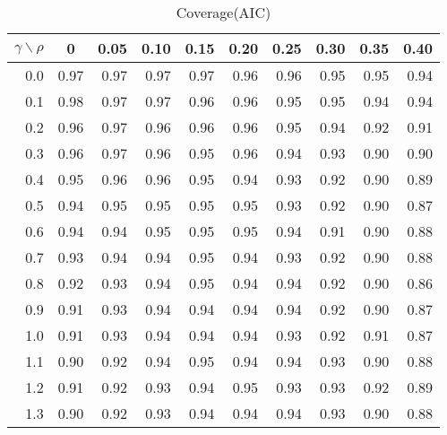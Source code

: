 \documentclass[12pt]{article}
\begin{document}
%
\begin{table}[!tbp]
\caption{Coverage(AIC)}
 \begin{center}
 \begin{tabular}{r|rrrrrrrrr}\hline\hline
\multicolumn{1}{c|}{$\gamma\backslash\rho$}&\multicolumn{1}{c}{0}&\multicolumn{1}{c}{0.05}&\multicolumn{1}{c}{0.10}&\multicolumn{1}{c}{0.15}&\multicolumn{1}{c}{0.20}&\multicolumn{1}{c}{0.25}&\multicolumn{1}{c}{0.30}&\multicolumn{1}{c}{0.35}&\multicolumn{1}{c}{0.40}\tabularnewline
\hline
0.0&0.97&0.97&0.97&0.97&0.96&0.96&0.95&0.95&0.94\tabularnewline
0.1&0.98&0.97&0.97&0.96&0.96&0.95&0.95&0.94&0.94\tabularnewline
0.2&0.96&0.97&0.96&0.96&0.96&0.95&0.94&0.92&0.91\tabularnewline
0.3&0.96&0.97&0.96&0.95&0.96&0.94&0.93&0.90&0.90\tabularnewline
0.4&0.95&0.96&0.96&0.95&0.94&0.93&0.92&0.90&0.89\tabularnewline
0.5&0.94&0.95&0.95&0.95&0.95&0.93&0.92&0.90&0.87\tabularnewline
0.6&0.94&0.94&0.95&0.95&0.95&0.94&0.91&0.90&0.88\tabularnewline
0.7&0.93&0.94&0.94&0.95&0.94&0.93&0.92&0.90&0.88\tabularnewline
0.8&0.92&0.93&0.94&0.95&0.94&0.94&0.92&0.90&0.86\tabularnewline
0.9&0.91&0.93&0.94&0.94&0.94&0.94&0.92&0.90&0.87\tabularnewline
1.0&0.91&0.93&0.94&0.94&0.94&0.93&0.92&0.91&0.87\tabularnewline
1.1&0.90&0.92&0.94&0.95&0.94&0.94&0.93&0.90&0.88\tabularnewline
1.2&0.91&0.92&0.93&0.94&0.95&0.93&0.93&0.92&0.89\tabularnewline
1.3&0.90&0.92&0.93&0.94&0.94&0.94&0.93&0.90&0.88\tabularnewline
\hline
\end{tabular}

\end{center}

\end{table}
\end{document}
